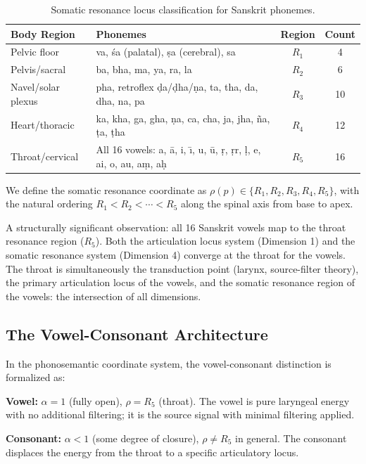 \documentclass[12pt]{article}
\begin{document}
\begin{table}[htbp]
\centering
\renewcommand{\arraystretch}{1.3}
\begin{tabular}{llcc}
\toprule
\textbf{Body Region} & \textbf{Phonemes} & \textbf{Region} & \textbf{Count} \\
\midrule
Pelvic floor & va, \'{s}a (palatal), \d{s}a (cerebral), sa & $R_1$ & 4 \\
Pelvis/sacral & ba, bha, ma, ya, ra, la & $R_2$ & 6 \\
Navel/solar plexus & pha, retroflex \d{d}a/\d{d}ha/\d{n}a, ta, tha, da, dha, na, pa & $R_3$ & 10 \\
Heart/thoracic & ka, kha, ga, gha, \d{n}a, ca, cha, ja, jha, \~{n}a, \d{t}a, \d{t}ha & $R_4$ & 12 \\
Throat/cervical & All 16 vowels: a, \={a}, i, \={\i}, u, \={u}, \d{r}, \d{r}r, \d{l}, e, ai, o, au, a\d{m}, a\d{h} & $R_5$ & 16 \\
\bottomrule
\end{tabular}
\caption{Somatic resonance locus classification for Sanskrit phonemes.}
\end{table}

We define the somatic resonance coordinate as $\rho(p) \in \{R_1, R_2, R_3, R_4, R_5\}$, with the natural ordering $R_1 < R_2 < \cdots < R_5$ along the spinal axis from base to apex.

A structurally significant observation: all 16 Sanskrit vowels map to the throat resonance region ($R_5$). Both the articulation locus system (Dimension 1) and the somatic resonance system (Dimension 4) converge at the throat for the vowels. The throat is simultaneously the transduction point (larynx, source-filter theory), the primary articulation locus of the vowels, and the somatic resonance region of the vowels: the intersection of all dimensions.

\subsection{The Vowel-Consonant Architecture}

In the phonosemantic coordinate system, the vowel-consonant distinction is formalized as:

\textbf{Vowel:} $\alpha = 1$ (fully open), $\rho = R_5$ (throat). The vowel is pure laryngeal energy with no additional filtering; it is the source signal with minimal filtering applied.

\textbf{Consonant:} $\alpha < 1$ (some degree of closure), $\rho \neq R_5$ in general. The consonant displaces the energy from the throat to a specific articulatory locus.
\end{document}
